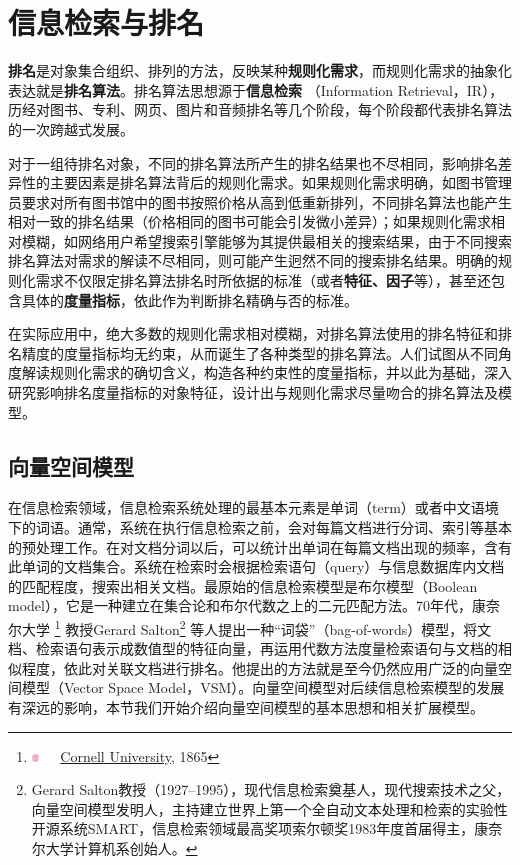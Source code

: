 \part{信息检索与排名}

\textbf{排名}是对象集合组织、排列的方法，反映某种\textbf{规则化需求}，而规则化需求的抽象化表达就是\textbf{排名算法}。排名算法思想源于\textbf{信息检索}
（Information Retrieval，IR），历经对图书、专利、网页、图片和音频排名等几个阶段，每个阶段都代表排名算法的一次跨越式发展。

对于一组待排名对象，不同的排名算法所产生的排名结果也不尽相同，影响排名差异性的主要因素是排名算法背后的规则化需求。如果规则化需求明确，如图书管理员要求对所有图书馆中的图书按照价格从高到低重新排列，不同排名算法也能产生相对一致的排名结果（价格相同的图书可能会引发微小差异）；如果规则化需求相对模糊，如网络用户希望搜索引擎能够为其提供最相关的搜索结果，由于不同搜索排名算法对需求的解读不尽相同，则可能产生迥然不同的搜索排名结果。明确的规则化需求不仅限定排名算法排名时所依据的标准（或者\textbf{特征、因子}等），甚至还包含具体的\textbf{度量指标}，依此作为判断排名精确与否的标准。

在实际应用中，绝大多数的规则化需求相对模糊，对排名算法使用的排名特征和排名精度的度量指标均无约束，从而诞生了各种类型的排名算法。人们试图从不同角度解读规则化需求的确切含义，构造各种约束性的度量指标，并以此为基础，深入研究影响排名度量指标的对象特征，设计出与规则化需求尽量吻合的排名算法及模型。

\chapter{向量空间模型}
在信息检索领域，信息检索系统处理的最基本元素是单词（term）或者中文语境下的词语。通常，系统在执行信息检索之前，会对每篇文档进行分词、索引等基本的预处理工作。在对文档分词以后，可以统计出单词在每篇文档出现的频率，含有此单词的文档集合。系统在检索时会根据检索语句（query）与信息数据库内文档的匹配程度，搜索出相关文档。最原始的信息检索模型是布尔模型（Boolean model），它是一种建立在集合论和布尔代数之上的二元匹配方法。70年代，康奈尔大学
\footnote{\includegraphics[width=2.0mm]{figures/university/cornell.eps}~~~\href{http://www.cornell.edu/}{Cornell University}, 1865}
教授Gerard Salton\footnote{Gerard Salton教授（1927--1995），现代信息检索奠基人，现代搜索技术之父，向量空间模型发明人，主持建立世界上第一个全自动文本处理和检索的实验性开源系统SMART，信息检索领域最高奖项索尔顿奖1983年度首届得主，康奈尔大学计算机系创始人。}
等人\cite{salton1975vector}提出一种“词袋”（bag-of-words）模型，将文档、检索语句表示成数值型的特征向量，再运用代数方法度量检索语句与文档的相似程度，依此对关联文档进行排名。他提出的方法就是至今仍然应用广泛的向量空间模型（Vector Space Model，VSM）。向量空间模型对后续信息检索模型的发展有深远的影响，本节我们开始介绍向量空间模型的基本思想和相关扩展模型。

